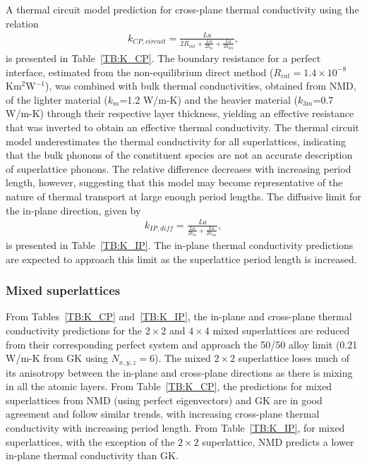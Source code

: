 \documentclass[aps,prb,preprint,preprintnumbers,amsmath,amssymb,floatfix,superscriptaddress]{revtex4}
\begin{document}
A thermal circuit model prediction for cross-plane thermal conductivity using the relation\cite{PhysRevB.77.184302}
\begin{equation}\label{EQ:TCircuit}
\begin{split}
k_{CP,circuit}= \frac{La}{2R_{int}+\frac{La}{2k_m}+\frac{La}{2k_{3m}}},
\end{split}
\end{equation}
is presented in Table~\ref{TB:K_CP}. The boundary resistance for a perfect interface, estimated from the non-equilibrium direct method ($R_{int}=1.4\times10^{-8}$ Km$^2$W$^{-1}$), was combined with bulk thermal conductivities, obtained from NMD, of the lighter material ($k_{m}$=1.2 W/m-K) and the heavier material ($k_{3m}$=0.7 W/m-K) through their respective layer thickness, yielding an effective resistance that was inverted to obtain an effective thermal conductivity. The thermal circuit model underestimates the thermal conductivity for all superlattices, indicating that the bulk phonons of the constituent species are not an accurate description of superlattice phonons. The relative difference decreases with increasing period length, however, suggesting that this model may become representative of the nature of thermal transport at large enough period lengths.
The diffusive limit for the in-plane direction, given by \cite{PhysRevB.77.184302}
\begin{equation}\label{EQ:TCircuit}
\begin{split}
k_{IP,diff}= \frac{La}{\frac{La}{2k_m}+\frac{La}{2k_{3m}}},
\end{split}
\end{equation}
is presented in Table~\ref{TB:K_IP}. The in-plane thermal conductivity predictions are expected to approach this limit as the superlattice period length is increased.
\subsubsection{Mixed superlattices}
From Tables~\ref{TB:K_CP} and~\ref{TB:K_IP}, the in-plane and cross-plane thermal conductivity predictions for the $2\times 2$ and $4\times 4$ mixed superlattices are reduced from their corresponding perfect system and approach the 50/50 alloy limit (0.21 W/m-K from GK using $N_{x,y,z}=6$). The mixed $2\times 2$ superlattice loses much of its anisotropy between the in-plane and cross-plane directions as there is mixing in all the atomic layers. From Table~\ref{TB:K_CP}, the predictions for mixed superlattices from NMD (using perfect eigenvectors) and GK are in good agreement and follow similar trends, with increasing cross-plane thermal conductivity with increasing period length. From Table~\ref{TB:K_IP}, for mixed superlattices, with the exception of  the $2 \times 2$ superlattice, NMD predicts a lower in-plane thermal conductivity than GK.
\end{document}
